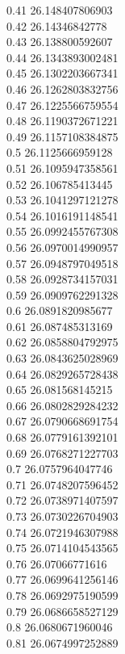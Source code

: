 {0.41	26.148407806903\\
0.42	26.14346842778\\
0.43	26.138800592607\\
0.44	26.1343893002481\\
0.45	26.1302203667341\\
0.46	26.1262803832756\\
0.47	26.1225566759554\\
0.48	26.1190372671221\\
0.49	26.1157108384875\\
0.5	26.1125666959128\\
0.51	26.1095947358561\\
0.52	26.106785413445\\
0.53	26.1041297121278\\
0.54	26.1016191148541\\
0.55	26.0992455767308\\
0.56	26.0970014990957\\
0.57	26.0948797049518\\
0.58	26.0928734157031\\
0.59	26.0909762291328\\
0.6	26.0891820985677\\
0.61	26.087485313169\\
0.62	26.0858804792975\\
0.63	26.0843625028969\\
0.64	26.0829265728438\\
0.65	26.081568145215\\
0.66	26.0802829284232\\
0.67	26.0790668691754\\
0.68	26.0779161392101\\
0.69	26.0768271227703\\
0.7	26.0757964047746\\
0.71	26.0748207596452\\
0.72	26.0738971407597\\
0.73	26.0730226704903\\
0.74	26.0721946307988\\
0.75	26.0714104543565\\
0.76	26.07066771616\\
0.77	26.0699641256146\\
0.78	26.0692975190599\\
0.79	26.0686658527129\\
0.8	26.0680671960046\\
0.81	26.0674997252889\\
}
